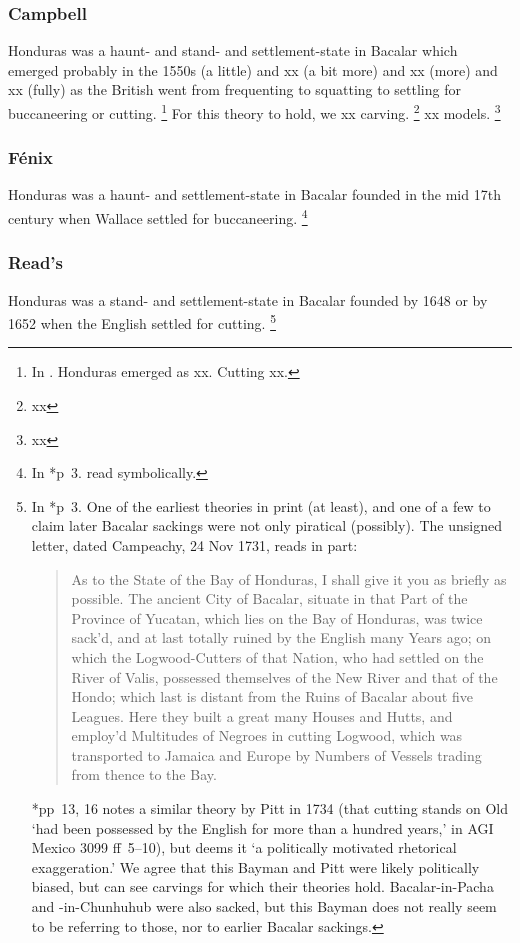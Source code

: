 		\subsubsection{Campbell}
		Honduras was a haunt- and stand- and settlement-state in Bacalar which emerged probably in the 1550s (a little) and xx (a bit more) and xx (more) and xx (fully) as the British went from frequenting to squatting to settling for buccaneering or cutting.%
		\footnote{In . Honduras emerged as xx. Cutting xx.}
		For this theory to hold, we xx carving.%
		\footnote{xx}
		xx models.%
		\footnote{xx}
		
		\subsubsection{Fénix}
		Honduras was a haunt- and settlement-state in Bacalar founded in the mid 17th century when Wallace settled for buccaneering.%
		\footnote{In \cite{fen49}*{p~3}.  read symbolically.}
		
		\subsubsection{Read's} %
		Honduras was a stand- and settlement-state in Bacalar founded by 1648 or by 1652 when the English settled for cutting.%
		\footnote{In \cite{rds32}*{p~3}. One of the earliest theories in print (at least), and one of a few to claim later Bacalar sackings were not only piratical (possibly). The unsigned letter, dated Campeachy, 24 Nov 1731, reads in part:\begin{quote}As to the State of the Bay of Honduras, I shall give it you as briefly as possible. The ancient City of Bacalar, situate in that Part of the Province of Yucatan, which lies on the Bay of Honduras, was twice sack'd, and at last totally ruined by the English many Years ago; on which the Logwood-Cutters of that Nation, who had settled on the River of Valis, possessed themselves of the New River and that of the Hondo; which last is distant from the Ruins of Bacalar about five Leagues. Here they built a great many Houses and Hutts, and employ'd Multitudes of Negroes in cutting Logwood, which was transported to Jamaica and Europe by Numbers of Vessels trading from thence to the Bay.\end{quote} \cite{res19}*{pp~13, 16} notes a similar theory by Pitt in 1734 (that cutting stands on Old `had been possessed by the English for more than a hundred years,' in AGI Mexico 3099 ff~5--10), but deems it `a politically motivated rhetorical exaggeration.' We agree that this Bayman and Pitt were likely politically biased, but can see carvings for which their theories hold. Bacalar-in-Pacha and -in-Chunhuhub were also sacked, but this Bayman does not really seem to be referring to those, nor to earlier Bacalar sackings.} %
		
